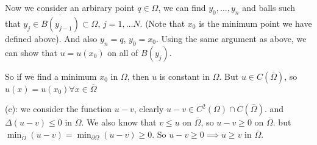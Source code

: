 \documentclass[a4paper]{article}
\theoremstyle{definition}
\begin{document}
    Now we consider an arbirary point $q\in \Omega$, we can find $y_0, \ldots,y_n$ and balls such that $y_j \in \overline{B\left( y_{j-1} \right) }\subset \Omega$, $j=1,\ldots N$. (Note that $x_0$ is the minimum point we have defined above). And also $y_n=q$, $y_0=x_0$. Using the same argument as above, we can show that $u=u\left( x_0 \right) $ on all of $B\left( y_j \right) $. 

    So if we find a minimum $x_0$ in $\Omega$, then $u$ is constant in $\Omega$. But $u\in C\left( \overline{\Omega} \right) $, so $u\left( x \right) =u\left( x_0 \right) \forall x\in \overline{\Omega} $

    (c): we consider the function $u-v$, clearly $u-v\in C^{2}\left( \Omega \right) \cap C\left( \overline{\Omega} \right) $. and $\Delta\left( u-v \right) \le 0$ in $\Omega$. We also know that $v\le u$ on $\overline{\Omega}$, so $u-v\ge 0$ on $\overline{\Omega}$. but $\min_{\overline{\Omega}}\left( u-v \right) =\min_{\partial \Omega}\left( u-v \right) \ge 0$. So $u-v\ge 0\implies u\ge v$ in $\overline{\Omega}$. 
\end{document}
